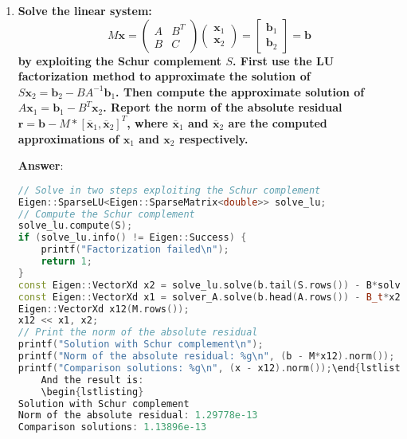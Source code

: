 \begin{enumerate}[label=\textcolor{Green3}{\textbf{\arabic*.}}]
    \newpage

    \item \textcolor{Green3}{\textbf{%
        Solve the linear system:
    }
    \begin{equation*}
        M\mathbf{x} = \begin{pmatrix}
            A & B^{T} \\ B & C
        \end{pmatrix}
        \begin{pmatrix}
            \mathbf{x}_{1} \\ \mathbf{x}_{2}
        \end{pmatrix}
        =
        \begin{bmatrix}
            \mathbf{b}_{1} \\ \mathbf{b}_{2}
        \end{bmatrix}
        =
        \mathbf{b}
    \end{equation*}
    \textbf{by exploiting the Schur complement $S$. First use the LU factorization method to approximate the solution of $S\mathbf{x}_{2} = \mathbf{b}_{2} - BA^{-1}\mathbf{b}_{1}$. Then compute the approximate solution of $A\mathbf{x}_{1} = \mathbf{b}_{1} - B^{T}\mathbf{x}_{2}$. Report the norm of the absolute residual $\mathbf{r} = \mathbf{b} - M * \left[\overline{\mathbf{x}}_{1}, \overline{\mathbf{x}}_{2}\right]^{T}$, where $\overline{\mathbf{x}}_{1}$ and $\overline{\mathbf{x}}_{2}$ are the computed approximations of $\mathbf{x}_{1}$ and $\mathbf{x}_{2}$ respectively.}
    }

    \textbf{Answer}:
    \begin{lstlisting}[language=C++]
// Solve in two steps exploiting the Schur complement
Eigen::SparseLU<Eigen::SparseMatrix<double>> solve_lu;
// Compute the Schur complement
solve_lu.compute(S);
if (solve_lu.info() != Eigen::Success) {
    printf("Factorization failed\n");
    return 1;
}
const Eigen::VectorXd x2 = solve_lu.solve(b.tail(S.rows()) - B*solver_A.solve(b.head(A.rows())));
const Eigen::VectorXd x1 = solver_A.solve(b.head(A.rows()) - B_t*x2);
Eigen::VectorXd x12(M.rows());
x12 << x1, x2;
// Print the norm of the absolute residual
printf("Solution with Schur complement\n");
printf("Norm of the absolute residual: %g\n", (b - M*x12).norm());
printf("Comparison solutions: %g\n", (x - x12).norm());\end{lstlisting}
    And the result is:
    \begin{lstlisting}
Solution with Schur complement
Norm of the absolute residual: 1.29778e-13
Comparison solutions: 1.13896e-13\end{lstlisting}
\end{enumerate}


